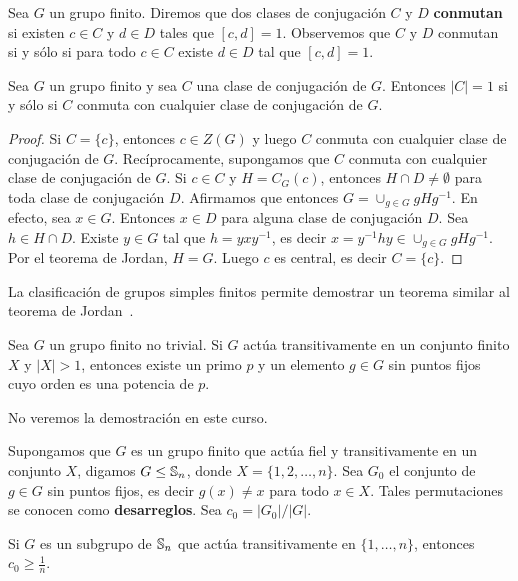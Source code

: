 Sea $G$ un grupo finito. Diremos que dos clases de conjugación $C$ y $D$ \textbf{conmutan} si existen 
$c\in C$ y $d\in D$ tales que $[c,d]=1$. 
Observemos que $C$ y $D$ conmutan si y sólo si para todo $c\in C$ existe $d\in D$ tal que $[c,d]=1$. 

\begin{corollary}[Wildon]
    Sea $G$ un grupo finito y sea $C$ una clase de conjugación de $G$. Entonces
    $|C|=1$ si y sólo si $C$ conmuta con cualquier clase de conjugación de $G$. 
\end{corollary}
    
\begin{proof}
    Si $C=\{c\}$, entonces $c\in Z(G)$ y luego $C$ conmuta con cualquier clase de conjugación de $G$. Recíprocamente, supongamos que 
    $C$ conmuta con cualquier clase de conjugación de $G$. Si $c\in C$ y $H=C_G(c)$, entonces $H\cap D\ne\emptyset$ para toda
    clase de conjugación $D$. Afirmamos que entonces $G=\cup_{g\in G}gHg^{-1}$. En efecto, sea $x\in G$. Entonces $x\in D$ 
    para alguna clase de conjugación $D$. 
    Sea 
    $h\in H\cap D$. Existe $y\in G$ tal que $h=yxy^{-1}$, es decir $x=y^{-1}hy\in \cup_{g\in G}gHg^{-1}$. Por el teorema de Jordan, 
    $H=G$. Luego $c$ es central, es decir $C=\{c\}$. 
\end{proof}

La clasificación de grupos simples finitos permite demostrar un teorema
similar al teorema de Jordan~\cite{MR636194}. 

\begin{theorem}
Sea $G$ un grupo finito no trivial. Si $G$ actúa transitivamente en un conjunto finito $X$ y $|X|>1$, entonces
existe un primo $p$ y un elemento $g\in G$ sin puntos fijos cuyo orden es una potencia de $p$. 
\end{theorem}

No veremos la demostración en este curso. 

Supongamos que $G$ es un grupo finito que actúa fiel y transitivamente en un conjunto $X$,
digamos $G\leq\mathbb{S}_n$, donde $X=\{1,2,\dots,n\}$. Sea 
$G_0$ el conjunto de $g\in G$ sin puntos fijos, es decir $g(x)\ne x$ para todo $x\in X$. 
Tales permutaciones se conocen como \textbf{desarreglos}. 
Sea $c_0=|G_0|/|G|$. 

\begin{theorem}
Si $G$ es un subgrupo de $\mathbb{S}_n$ que actúa transitivamente en $\{1,\dots,n\}$, entonces $c_0\geq\frac{1}{n}$.
\end{theorem}

